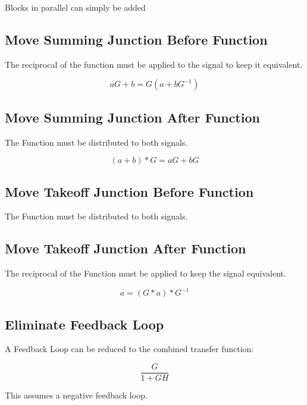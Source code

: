 \documentclass{../templates/topic}
\begin{document}
Blocks in parallel can simply be added

\subsection{Move Summing Junction Before Function}

The reciprocal of the function must be applied to the signal to keep it equivalent.

\begin{equation*}
	aG + b = G(a+bG^{-1})
\end{equation*}

\subsection{Move Summing Junction After Function}

The Function must be distributed to both signals.

\begin{equation*}
	(a+b)*G = aG+bG
\end{equation*}

\subsection{Move Takeoff Junction Before Function}

The Function must be distributed to both signals.

\subsection{Move Takeoff Junction After Function}

The reciprocal of the Function must be applied to keep the signal equivalent.

\begin{equation*}
	a = (G*a)*G^{-1}
\end{equation*}

\subsection{Eliminate Feedback Loop}

A Feedback Loop can be reduced to the combined transfer function:

\begin{equation}
	\frac{G}{1+GH}
\end{equation}

This assumes a negative feedback loop.
\end{document}

